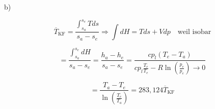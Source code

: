 b)

\[
\overline{T}_{\text{KF}} = \frac{\int_{s_a}^{s_e} T ds}{s_a - s_e} \Rightarrow \int dH = T ds + V dp \quad \text{weil isobar}
\]

\[
= \frac{\int_{s_a}^{s_e} dH}{s_a - s_e} = \frac{h_a - h_e}{s_a - s_e} = \frac{cp_l (T_e - T_a)}{cp_l \frac{T_e}{T_e} - R \ln \left( \frac{p_e}{p_e} \right) \rightarrow 0}
\]

\[
= \frac{T_a - T_e}{\ln \left( \frac{T_e}{T_a} \right)} = 283,124 \overline{T}_{\text{KF}}
\]